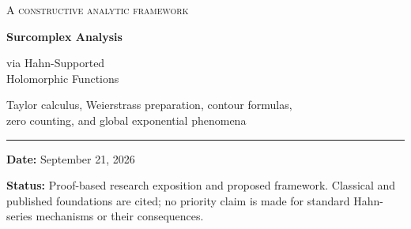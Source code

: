 \documentclass[11pt,letterpaper]{article}
\numberwithin{equation}{section}
\theoremstyle{definition}
\theoremstyle{remark}
\newcommand{\No}{\mathbf{No}}
\newcommand{\K}{\mathbb{K}}
\begin{document}
\begin{titlepage}
\vspace*{0.45in}
{\color{Ink}\Large\textsc{A constructive analytic framework}}\par
\vspace{0.4in}
{\color{Ink}\Huge\bfseries Surcomplex Analysis}\par
\vspace{0.18in}
{\LARGE via Hahn-Supported\\[4pt] Holomorphic Functions}\par
\vspace{0.4in}
{\large Taylor calculus, Weierstrass preparation, contour formulas,\\[3pt]
zero counting, and global exponential phenomena}\par
\vspace{0.5in}
\noindent\rule{\textwidth}{0.6pt}
\vspace{0.12in}
\begin{abstract}
\noindent We construct a coherent theory of analytic functions with values in the
surcomplex field $\K=\No[i]$. The basic objects are set-supported Hahn series
with ordinary holomorphic coefficient functions. Taylor evaluation turns these
objects into genuine functions at finite surcomplex arguments, while affine
charts move the construction to arbitrary centers and scales. We prove a strong
Taylor theorem, identity, open-mapping, and maximum-modulus principles, a constructive
Weierstrass preparation and division theorem, a perturbative inverse theorem,
Cauchy and Morera theorems, and a residue theorem whose residues are taken at
actual surcomplex poles. An infinitesimal Rouch\'e theorem counts all zeros,
including nonstandard splittings of multiple zeros. We also construct a
surjective exponential on the finite-imaginary strip, exhibit explicit global
exponential extensions, and prove that any conjugation-compatible global
extension must acquire nonstandard periods.

The assumptions are essential. The full surreal topology admits no
non-eventually-constant convergent set-indexed nets. Ordinary contour paths
therefore cannot supply the proposed integrals. We distinguish Hahn summation
from topological convergence and prove counterexamples to unrestricted
identity, Liouville, and Schwarz principles. The resulting theory is a
specified analytic category, not a claim that all conceivable surcomplex
functions satisfy classical complex analysis.
\end{abstract}
\vfill
\noindent\textbf{Date:} September 21, 2026\par
\noindent\textbf{Status:} Proof-based research exposition and proposed framework.
Classical and published foundations are cited; no priority claim is made for
standard Hahn-series mechanisms or their consequences.
\end{titlepage}
\tableofcontents
\newpage
\end{document}
